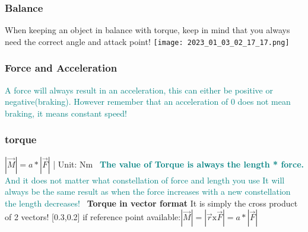 \documentclass[main.tex,fontsize=8pt,paper=a4,paper=portrait,DIV=calc,]{scrartcl}
\begin{document}
\begin{multicols*}{2}
\subsubsection{Balance}
When keeping an object in balance with torque, keep in mind that you always need the correct angle and attack point!\newline
\texttt{[image: 2023\_01\_03\_02\_17\_17.png]}

\subsubsection{Force and Acceleration} 
\textcolor{teal}{A force will always result in an acceleration, this can either be positive or negative(braking).\newline
However remember that an acceleration of 0 does not mean braking, it means constant speed!}

\subsubsection{torque}
\Large \( |\vec{M}| = a * |\vec{F}| \) | Unit: Nm\newline
\, \newline
\textcolor{teal}{ \normalsize \textbf{The value of Torque is always the length * force.}\newline
And it does not matter what constellation of force and length you use\newline
It will always be the same result as when the force increases with a new constellation the length decreases!}\newline
\, \newline
\textbf{Torque in vector format}\newline
It is simply the cross product of 2 vectors!\newline
{}\newline
{}
{}[0.3,0.2]
\Large if reference point available:\newline \( |\vec{M}| = | \vec{r} \text{x} \vec{F} | = a * | \vec{F} | \ \)


\end{multicols*}
\end{document}
